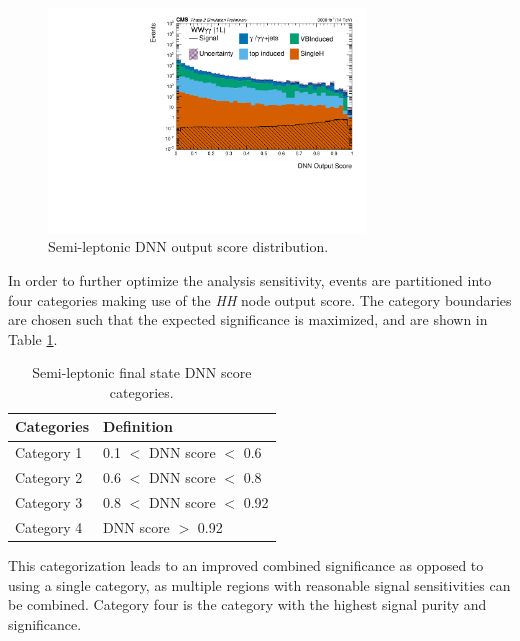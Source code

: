 \begin{figure}[!htb]
    \centering
    \includegraphics[width=0.75\textwidth]{Sections/Phase_II_HH/images/DNN/DNN_Score_WW_logy.pdf}
    \caption{Semi-leptonic DNN output score distribution.}
    \label{fig:oneL_perf}
\end{figure}

In order to further optimize the analysis sensitivity, events are partitioned into four categories making use of the \textit{HH} node output score. The category boundaries are chosen such that the expected significance is maximized, and are shown in Table \ref{tab:OneLcats}.

\begin{table}[!htb]
  \centering
  \begin{tabular}{ll}
    \hline 
    Categories & Definition\\
    \hline 
    Category 1  & 0.1 $<$ DNN score $<$ 0.6 \\
    Category 2  & 0.6 $<$ DNN score $<$ 0.8 \\
    Category 3  & 0.8 $<$ DNN score $<$ 0.92 \\
    Category 4  & DNN score $>$ 0.92 \\
    \hline
   \end{tabular}
    \caption{
      Semi-leptonic final state DNN score categories.
    }
    \label{tab:OneLcats}
\end{table}

This categorization leads to an improved combined significance as opposed to using a single category, as multiple regions with reasonable signal sensitivities can be combined. Category four is the category with the highest signal purity and significance.  


